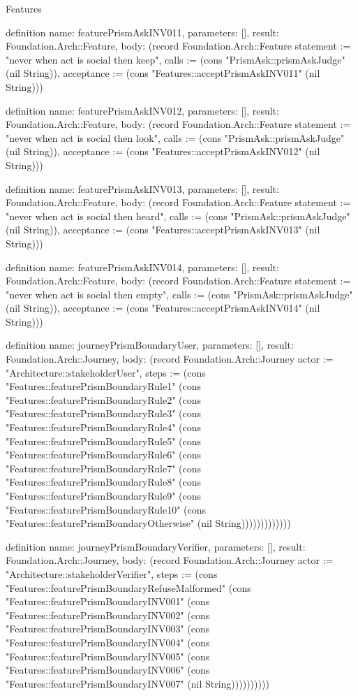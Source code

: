 \begin{lexlean}{Features}
\begin{semanticmodule}
definition{
  name: featurePrismAskINV011,
  parameters: [],
  result: Foundation.Arch::Feature,
  body: (record Foundation.Arch::Feature {statement := "never when act is social then keep", calls := (cons "PrismAsk::prismAskJudge" (nil String)), acceptance := (cons "Features::acceptPrismAskINV011" (nil String))})
}

definition{
  name: featurePrismAskINV012,
  parameters: [],
  result: Foundation.Arch::Feature,
  body: (record Foundation.Arch::Feature {statement := "never when act is social then look", calls := (cons "PrismAsk::prismAskJudge" (nil String)), acceptance := (cons "Features::acceptPrismAskINV012" (nil String))})
}

definition{
  name: featurePrismAskINV013,
  parameters: [],
  result: Foundation.Arch::Feature,
  body: (record Foundation.Arch::Feature {statement := "never when act is social then heard", calls := (cons "PrismAsk::prismAskJudge" (nil String)), acceptance := (cons "Features::acceptPrismAskINV013" (nil String))})
}

definition{
  name: featurePrismAskINV014,
  parameters: [],
  result: Foundation.Arch::Feature,
  body: (record Foundation.Arch::Feature {statement := "never when act is social then empty", calls := (cons "PrismAsk::prismAskJudge" (nil String)), acceptance := (cons "Features::acceptPrismAskINV014" (nil String))})
}

definition{
  name: journeyPrismBoundaryUser,
  parameters: [],
  result: Foundation.Arch::Journey,
  body: (record Foundation.Arch::Journey {actor := "Architecture::stakeholderUser", steps := (cons "Features::featurePrismBoundaryRule1" (cons "Features::featurePrismBoundaryRule2" (cons "Features::featurePrismBoundaryRule3" (cons "Features::featurePrismBoundaryRule4" (cons "Features::featurePrismBoundaryRule5" (cons "Features::featurePrismBoundaryRule6" (cons "Features::featurePrismBoundaryRule7" (cons "Features::featurePrismBoundaryRule8" (cons "Features::featurePrismBoundaryRule9" (cons "Features::featurePrismBoundaryRule10" (cons "Features::featurePrismBoundaryOtherwise" (nil String))))))))))))})
}

definition{
  name: journeyPrismBoundaryVerifier,
  parameters: [],
  result: Foundation.Arch::Journey,
  body: (record Foundation.Arch::Journey {actor := "Architecture::stakeholderVerifier", steps := (cons "Features::featurePrismBoundaryRefuseMalformed" (cons "Features::featurePrismBoundaryINV001" (cons "Features::featurePrismBoundaryINV002" (cons "Features::featurePrismBoundaryINV003" (cons "Features::featurePrismBoundaryINV004" (cons "Features::featurePrismBoundaryINV005" (cons "Features::featurePrismBoundaryINV006" (cons "Features::featurePrismBoundaryINV007" (nil String)))))))))})
}


\end{semanticmodule}
\end{lexlean}
